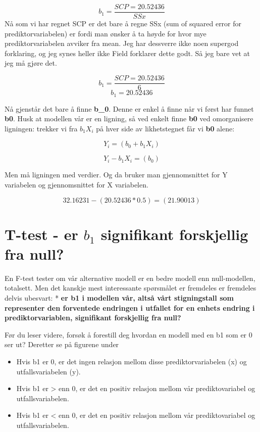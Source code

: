 \documentclass[
]{book}
\providecommand{\tightlist}{%
  \setlength{\itemsep}{0pt}\setlength{\parskip}{0pt}}
\begin{document}
\[ b_1 = \frac{SCP = 20.52436}{SSx} \]
Nå som vi har regnet SCP er det bare å regne SSx (sum of squared error for prediktorvariabelen) er fordi man ønsker å ta høyde for hvor mye prediktorvariabelen avviker fra mean. Jeg har dessverre ikke noen supergod forklaring, og jeg synes heller ikke Field forklarer dette godt. Så jeg bare vet at jeg må gjøre det.

\[ b_1 = \frac{SCP = 20.52436}{6} \]
\[ b_1 = 20.52436 \]

Nå gjenstår det bare å finne \textbf{b\_0}. Denne er enkel å finne når vi først har funnet \textbf{b0}. Husk at modellen vår er en ligning, så ved enkelt finne \textbf{b0} ved omorganisere ligningen: trekker vi fra \(b_1X_i\) på hver side av likhetstegnet får vi \textbf{b0} alene:

\[
Y_i = (b_0 + b_1X_i)
\]

\[
Y_i - b_1X_i = (b_0)
\]

Men må ligningen med verdier. Og da bruker man gjennomsnittet for Y variabelen og gjennomsnittet for X variabelen.

\[
32.16231     - (20.52436*0.5) = (21.90013)
\]

\hypertarget{t-test---er-b_1-signifikant-forskjellig-fra-null}{%
\chapter{\texorpdfstring{T-test - er \(b_1\) signifikant forskjellig fra null?}{T-test - er b\_1 signifikant forskjellig fra null?}}\label{t-test---er-b_1-signifikant-forskjellig-fra-null}}

En F-test tester om vår alternative modell er en bedre modell enn null-modellen, totalsett. Men det kanskje mest interessante spørsmålet er fremdeles er fremdeles delvis ubesvart:
* \textbf{er b1 i modellen vår, altså vårt stigningstall som representer den forventede endringen i utfallet for en enhets endring i prediktorvariablen, signifikant forskjellig fra null?}

Før du leser videre, forsøk å forestill deg hvordan en modell med en b1 som er 0 ser ut? Deretter se på figurene under

\begin{itemize}
\tightlist
\item
  Hvis b1 er 0, er det ingen relasjon mellom disse prediktorvariabelen (x) og utfallsvariabelen (y).
\item
  Hvis b1 er \textgreater{} enn 0, er det en positiv relasjon mellom vår prediktovariabel og utfallsvariabelen.
\item
  Hvis b1 er \textless{} enn 0, er det en positiv relasjon mellom vår prediktovariabel og utfallsvariabelen.
\end{itemize}
\end{document}
